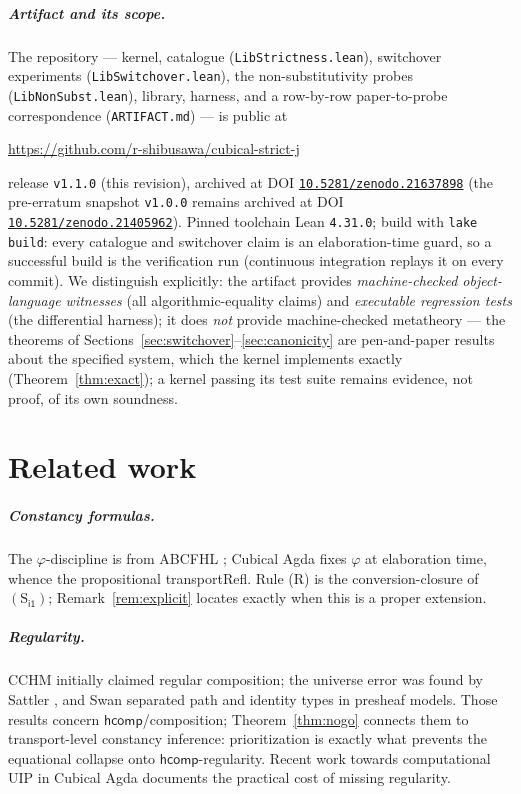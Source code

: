 \documentclass{lmcs}
\newcommand{\hcomp}{\mathsf{hcomp}}
\newcommand{\ii}{\mathsf{i1}}
\begin{document}
\subparagraph*{Artifact and its scope.}  The repository --- kernel,
catalogue (\texttt{LibStrictness.lean}), switchover experiments
(\texttt{LibSwitchover.lean}), the non-substitutivity probes
(\texttt{LibNonSubst.lean}), library, harness, and a row-by-row
paper-to-probe correspondence (\texttt{ARTIFACT.md}) --- is public at
\begin{center}
  \url{https://github.com/r-shibusawa/cubical-strict-j}
\end{center}
release \texttt{v1.1.0} (this revision), archived at DOI
\href{https://doi.org/10.5281/zenodo.21637898}%
{\texttt{10.5281/zenodo.21637898}} (the pre-erratum snapshot
\texttt{v1.0.0} remains archived at DOI
\href{https://doi.org/10.5281/zenodo.21405962}%
{\texttt{10.5281/zenodo.21405962}}).  Pinned toolchain
Lean \texttt{4.31.0}; build with \texttt{lake build}: every catalogue
and switchover claim is an elaboration-time guard, so a successful
build is the verification run (continuous integration replays it on
every commit).  We distinguish explicitly: the artifact provides
\emph{machine-checked object-language witnesses} (all
algorithmic-equality claims) and \emph{executable regression tests}
(the differential harness); it does \emph{not} provide machine-checked
metatheory --- the theorems of
Sections~\ref{sec:switchover}--\ref{sec:canonicity} are pen-and-paper
results about the specified system, which the kernel implements
exactly (Theorem~\ref{thm:exact}); a kernel passing its test suite
remains evidence, not proof, of its own soundness.

\section{Related work}
\label{sec:related}

\subparagraph*{Constancy formulas.}  The $\varphi$-discipline is from
ABCFHL \cite{ABCFHL}; Cubical Agda \cite{VezzosiMortbergAbel} fixes
$\varphi$ at elaboration time, whence the propositional
\textsf{transportRefl}.  Rule (R) is the conversion-closure of
$(\mathrm{S}_{\ii})$; Remark~\ref{rem:explicit} locates exactly when
this is a proper extension.

\subparagraph*{Regularity.}  CCHM \cite{CCHM} initially claimed
regular composition; the universe error was found by Sattler
\cite{SattlerNote}, and Swan \cite{SwanRegularity} separated path and
identity types in presheaf models.  Those results concern
$\hcomp$/composition; Theorem~\ref{thm:nogo} connects them to
transport-level constancy inference: prioritization is exactly what
prevents the equational collapse onto $\hcomp$-regularity.  Recent
work towards computational UIP in Cubical Agda \cite{UIPCubical}
documents the practical cost of missing regularity.
\end{document}
